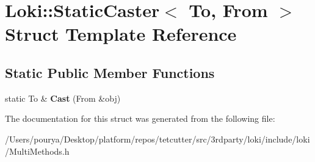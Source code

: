 \hypertarget{structLoki_1_1StaticCaster}{}\section{Loki\+:\+:Static\+Caster$<$ To, From $>$ Struct Template Reference}
\label{structLoki_1_1StaticCaster}
\subsection*{Static Public Member Functions}
\begin{DoxyCompactItemize}
\item 
\hypertarget{structLoki_1_1StaticCaster_a01f946c8a0930a70f341d1abda8f794d}{}static To \& {\bfseries Cast} (From \&obj)\label{structLoki_1_1StaticCaster_a01f946c8a0930a70f341d1abda8f794d}

\end{DoxyCompactItemize}


The documentation for this struct was generated from the following file\+:\begin{DoxyCompactItemize}
\item 
/\+Users/pourya/\+Desktop/platform/repos/tetcutter/src/3rdparty/loki/include/loki/Multi\+Methods.\+h\end{DoxyCompactItemize}

